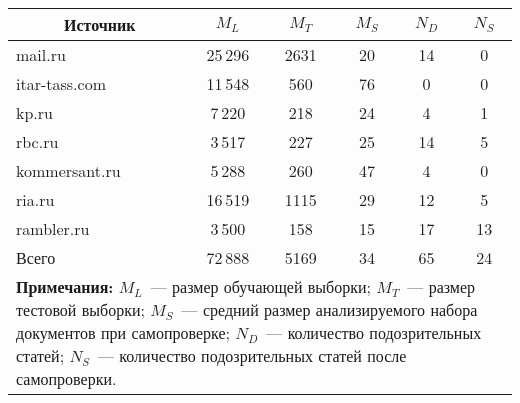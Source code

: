 \begin{multicols}{2}
{\small  \begin{center} 
  \tabcolsep=5pt
  \begin{tabular}{|l|c|c|c|c|c|}
  \hline
\multicolumn{1}{|c|}{Источник}&$M_L$&$M_T$&$M_S$&$N_D$&$N_S$\\
\hline
{\sf mail.ru}&25\,296&2631\hphantom{9}&20&14&0\\
{\sf itar-tass.com}&11\,548&560&76&\hphantom{9}0&0\\
{\sf kp.ru}&\hphantom{9}7\,220&218&24&\hphantom{9}4&1\\
{\sf rbc.ru}&\hphantom{9}3\,517&227&25&14&5\\
{\sf kommersant.ru}&\hphantom{9}5\,288&260&47&\hphantom{9}4&0\\
{\sf ria.ru}&16\,519&1115&29&12&5\\
{\sf rambler.ru}&\hphantom{9}3\,500&\hphantom{9}158&15&17&13\hphantom{9}\\
\hline
Всего&72\,888&5169&34&65&24\hphantom{9}\\
\hline
\multicolumn{6}{p{220pt}}{\footnotesize \textbf{Примечания:} $M_L$~--- размер обучающей 
выборки; $M_T$~--- размер тестовой выборки; $M_S$~--- средний размер 
анализируемого набора документов при самопроверке; $N_D$~--- количество 
подозрительных статей; $N_S$~--- количество подозрительных статей после 
самопроверки.}
\end{tabular}
\end{center}
}

\addtocounter{table}{1}



\setcounter{table}{1}
\begin{table*}\small %
\begin{center}
\vspace*{2ex}


\end{center}
\end{table*}
\end{multicols}
